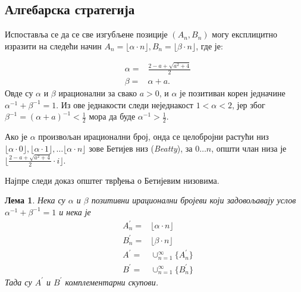 \documentclass[a4paper]{article}
\newtheorem{lemma}{Лема}
\begin{document}
\subsection{Алгебарска стратегија}

Испоставља се да се све изгубљене позиције $ (A_{n}, B_{n}) $ могу експлицитно изразити на следећи начин $ A_{n} = \lfloor \alpha \cdot n \rfloor, B_{n} = \lfloor \beta \cdot n \rfloor $, где је:

\begin{eqnarray}
	&\alpha = &\frac{2 - a + \sqrt{a^2 + 4}}{2} \label{def:alpha}\\  
	&\beta = &\alpha + a \label{def:beta}.
\end{eqnarray}
Овде су $ \alpha $ и $ \beta $ ирационални за свако $ a > 0 $, и $ \alpha $ је позитиван корен једначине $ \alpha^{-1} + \beta^{-1} = 1 $. Из ове једнакости следи неједнакост
$ 1<\alpha<2 $, јер због $ \beta^{-1} = (\alpha+a)^{-1} < \frac{1}{2 }$ мора да буде $ \alpha^{-1} > \frac{1}{2} $.

Ако је $ \alpha $ произвољан ирационални број, онда се целобројни растући низ $ \lfloor \alpha \cdot 0 \rfloor, \lfloor \alpha \cdot 1 \rfloor, \ldots \lfloor \alpha \cdot n \rfloor $ зове Бетијев низ (\textit{{Beatty}}), за $ 0 \ldots n $, општи члан низа је $ \lfloor \frac{2-a+\sqrt{a^{2}+4}}{2} \cdot i \rfloor $.

Најпре следи доказ општег тврђења о Бетијевим низовима.

\begin{lemma}
	\label{lemma:alg_komplementarnost}
	Нека су $ \alpha $ и $ \beta $ позитивни ирационални бројеви који задовољавају услов $ \alpha^{-1} + \beta^{-1} = 1 $ и нека је 
	\begin{eqnarray*} 
		&A^{'}_{n}= &\lfloor \alpha \cdot n \rfloor\\
		&B^{'}_{n} = &\lfloor \beta \cdot n \rfloor\\
		&A^{'} = &\cup_{n=1}^{\infty}\{A^{'}_{n}\}\\
		&B^{'} = &\cup_{n=1}^{\infty}\{B^{'}_{n}\}
	\end{eqnarray*}
	Тада су $ A^{'} $ и $ B^{'} $ комплементарни скупови.
\end{lemma}
\end{document}
